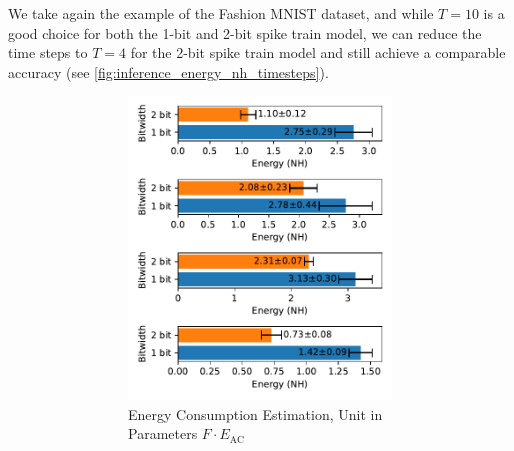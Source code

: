         We take again the example of the Fashion MNIST dataset, and while $T=10$ is a good choice for both the 1-bit and 2-bit spike train model, we can reduce the time steps to $T=4$ for the 2-bit spike train model and still achieve a comparable accuracy (see \ref{fig:inference_energy_nh_timesteps}). 
        \begin{figure}[!htpb]
            \centering
            \begin{subfigure}[H]{\textwidth}
                \centering
                \begin{subfigure}[H]{0.49\textwidth}
                    \includegraphics[width=\textwidth]{../timesteps/FashionMNIST/plots/fashionmnist_test_energy_nh.pdf}
                    \caption{Energy Consumption Estimation, Unit in Parameters $F\cdot E_{\text{AC}}$}
                \end{subfigure}
                \hfill
                \begin{subfigure}[H]{0.49\textwidth}

\end{subfigure}
\end{subfigure}
\end{figure}
